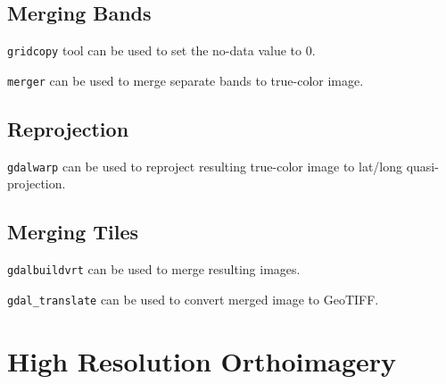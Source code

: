 \begin{codelistbash}
  
\end{codelistbash}

\subsection{Merging Bands}

\texttt{gridcopy} tool can be used to set the no-data value to 0.

\begin{codelistbash}
  
\end{codelistbash}

\texttt{merger} can be used to merge separate bands to true-color image.

\begin{codelistbash}
  
\end{codelistbash}

\subsection{Reprojection}

\texttt{gdalwarp} can be used to reproject resulting true-color image to lat/long quasi-projection.

\begin{codelistbash}
  
\end{codelistbash}

\subsection{Merging Tiles}

\texttt{gdalbuildvrt} can be used to merge resulting images.

\begin{codelistbash}
  
\end{codelistbash}

\texttt{gdal\_translate} can be used to convert merged image to GeoTIFF.

\begin{codelistbash}
  
\end{codelistbash}

\section{High Resolution Orthoimagery}


